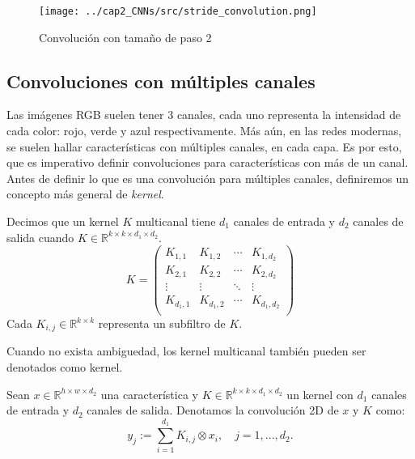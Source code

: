  \begin{figure}[H]
    \centering
    \texttt{[image: ../cap2\_CNNs/src/stride\_convolution.png]}
    \caption{Convolución con tamaño de paso 2} 
\end{figure}
 \subsection{Convoluciones con múltiples canales}
 Las imágenes RGB suelen tener 3 canales, cada uno representa la intensidad de cada color: rojo, verde y azul respectivamente. Más aún, en las redes modernas, se suelen hallar características con múltiples canales, en cada capa. Es por esto, que es imperativo definir convoluciones para características con más de un canal.
 Antes de definir lo que es una convolución para múltiples canales, definiremos un concepto más general de \textsl{kernel}.
 \begin{definition}
    Decimos que un kernel $K$ multicanal tiene $d_1$ canales de entrada y $d_2$ canales de salida cuando $K\in \mathbb R^{k\times k\times d_1 \times d_2}$.
    $$K = \left(
        \begin{matrix}
            K_{1,1} & K_{1,2} & \cdots & K_{1,d_2} \\
            K_{2,1} & K_{2,2} & \cdots & K_{2,d_2} \\
            \vdots & \vdots & \ddots & \vdots \\
            K_{d_1,1} & K_{d_1,2} & \cdots & K_{d_1,d_2} \\
        \end{matrix}
    \right)$$  
    Cada $K_{i,j}\in \mathbb R^{k\times k}$ representa un subfiltro de $K$.
 \end{definition}
 Cuando no exista ambiguedad, los kernel multicanal también pueden ser denotados como kernel.
 \begin{definition}
    Sean $x\in \mathbb R^{h \times w \times d_2}$ una característica y $K\in \mathbb R^{k\times k \times d_1\times d_2}$ un kernel con $d_1$ canales de entrada y $d_2$ canales de salida. Denotamos la convolución 2D de $x$ y $K$ como:
    \begin{equation}
        y_j := \sum_{i=1}^{d_1} K_{i,j} \otimes x_i, \quad j = 1, ..., d_2.
    \end{equation}

 \end{definition}
